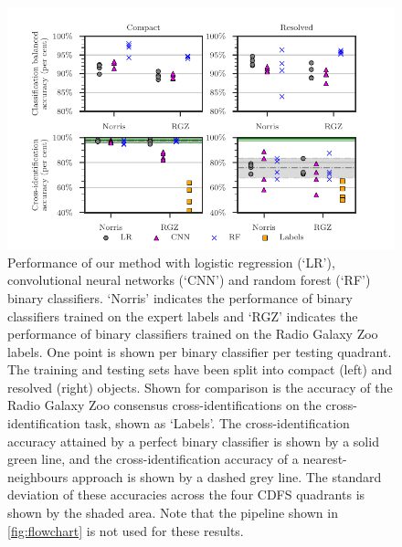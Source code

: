     \begin{figure}
    \centering
    \includegraphics[]{atlas-images/cdfs-grid-new.pdf}
    \caption[Performance of our method with different binary classifiers on the binary classification task.]{Performance of our method with logistic regression (`LR'), convolutional neural networks (`CNN') and random forest (`RF') binary classifiers. `Norris' indicates the performance of binary classifiers trained on the expert labels and `RGZ' indicates the performance of binary classifiers trained on the Radio Galaxy Zoo labels. One point is shown per binary classifier per testing quadrant. The training and testing sets have been split into compact (left) and resolved (right) objects. {Shown for comparison is the accuracy of the Radio Galaxy Zoo consensus cross-identifications on the cross-identification task, shown as `Labels'.} The cross-identification accuracy attained by a perfect binary classifier is shown by a solid green line, and the cross-identification accuracy of a nearest-neighbours approach is shown by a dashed grey line. The standard deviation of these accuracies across the four CDFS quadrants is shown by the shaded area. Note that the pipeline shown in \autoref{fig:flowchart} is not used for these results. \label{fig:ba}}
    \end{figure}

